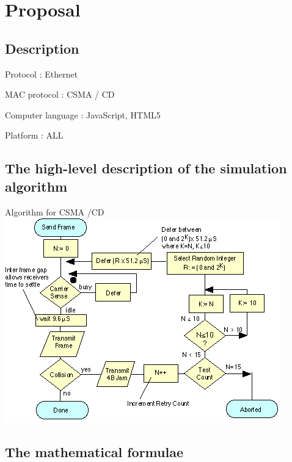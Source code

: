 \section{Proposal}



\subsection{Description}

\begin{description}
    \item Protocol : Ethernet
    \item MAC protocol : CSMA / CD
    \item Computer language : JavaScript, HTML5
    \item Platform : ALL
\end{description}

\subsection{The high-level description of the simulation algorithm}


\begin{center}
\item Algorithm for CSMA /CD
\includegraphics[scale=0.8]{ether.png}
\end{center}

\newpage

\subsection{The mathematical formulae}

